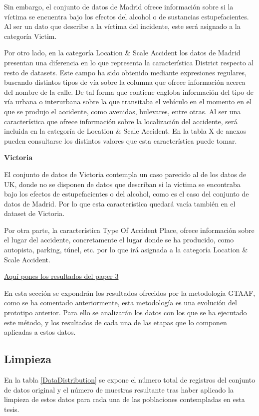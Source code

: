 \documentclass{uathesis-es}
\begin{document}
{	Sin embargo, el conjunto de datos de Madrid ofrece información sobre si la víctima se encuentra bajo los efectos del alcohol o de sustancias estupefacientes. Al ser un dato que describe a la víctima del incidente, este será asignado a la categoría Victim.
	
	Por otro lado, en la categoría Location \& Scale Accident los datos de Madrid presentan una diferencia en lo que representa la característica District respecto al resto de datasets. Este campo ha sido obtenido mediante expresiones regulares, buscando distintos tipos de vía sobre la columna que ofrece información acerca del nombre de la calle. De tal forma que contiene engloba información del tipo de vía urbana o interurbana sobre la que transitaba el vehículo en el momento en el que se produjo el accidente, como avenidas, bulevares, entre otras. Al ser una característica que ofrece información sobre la localización del accidente, será incluida en la categoría de Location \& Scale Accident. En la tabla X de anexos pueden consultarse los distintos valores que esta característica puede tomar.
	
	\textbf{Victoria}
	
	El conjunto de datos de Victoria contempla un caso parecido al de los datos de UK, donde no se disponen de datos que describan si la víctima se encontraba bajo los efectos de estupefacientes o del alcohol, como es el caso del conjunto de datos de Madrid. Por lo que esta característica quedará vacía también en el dataset de Victoria.
	
	Por otra parte, la característica Type Of Accident Place, ofrece información sobre el lugar del accidente, concretamente el lugar donde se ha producido, como autopista, parking, túnel, etc. por lo que irá asignada a la categoría Location \& Scale Accident.
	
	
	
	\underline{Aquí pones los resultados del paper 3}
	
	En esta sección se expondrán los resultados ofrecidos por la metodología GTAAF, como se ha comentado anteriormente, esta metodología es una evolución del prototipo anterior. Para ello se analizarán los datos con los que se ha ejecutado este método, y los resultados de cada una de las etapas que lo componen aplicadas a estos datos.
	
	
	\subsection{Limpieza}
	En la tabla \ref{DataDistribution} se expone el número total de registros del conjunto de datos original y el número de muestras resultante tras haber aplicado la limpieza de estos datos para cada una de las poblaciones contempladas en esta tesis.
	
}
\end{document}
